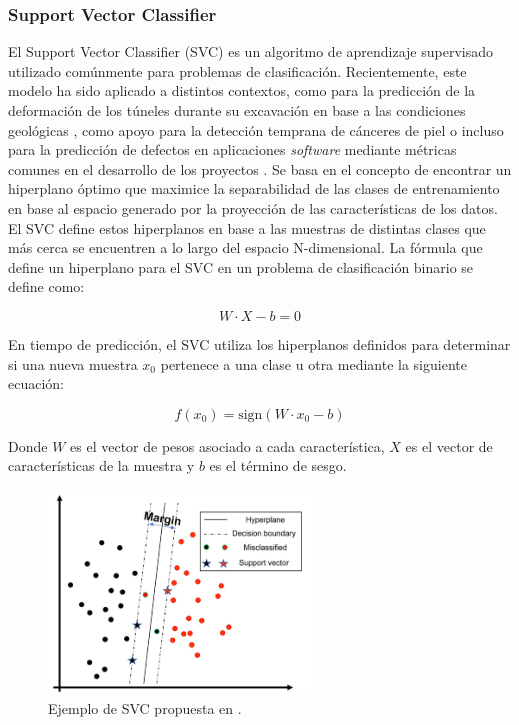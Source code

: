\documentclass{uathesis-es}
\begin{document}
\subsubsection*{Support Vector Classifier}


El Support Vector Classifier (SVC) es un algoritmo de aprendizaje supervisado utilizado comúnmente para problemas de clasificación. Recientemente, este modelo ha sido aplicado a distintos contextos, como para la predicción de la deformación de los túneles durante su excavación en base a las condiciones geológicas \cite{zhou2022predicting}, como apoyo para la detección temprana de cánceres de piel \cite{arora2022bag} o incluso para la predicción de defectos en aplicaciones \textit{software} mediante métricas comunes en el desarrollo de los proyectos \cite{goyal2022effective}. Se basa en el concepto de encontrar un hiperplano óptimo que maximice la separabilidad de las clases de entrenamiento en base al espacio generado por la proyección de las características de los datos. El SVC define estos hiperplanos en base a las muestras de distintas clases que más cerca se encuentren a lo largo del espacio N-dimensional. La fórmula que define un hiperplano para el SVC en un problema de clasificación binario se define como:

\[
    W \cdot X - b = 0
\]

En tiempo de predicción, el SVC utiliza los hiperplanos definidos para determinar si una nueva muestra $x_0$ pertenece a una clase u otra mediante la siguiente ecuación:

\[
    f({x_0}) = \text{sign}({W} \cdot {x_0} - b)
\]

Donde $W$ es el vector de pesos asociado a cada característica, $X$ es el vector de características de la muestra y $b$ es el término de sesgo.

\begin{figure}[H]
    \centering
    \includegraphics[width=7cm]{Figures/Background/SVC.png}
    \caption{Ejemplo de SVC propuesta en \cite{MISRA2020243}.}
    \label{SVC_BACKGROUND}
\end{figure}
\end{document}
